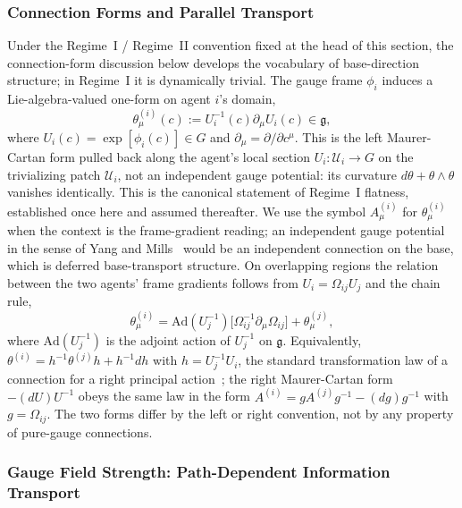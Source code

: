 \documentclass[11pt]{article}
\begin{document}
\subsubsection{Connection Forms and Parallel Transport}
\label{sec:connection_forms}

Under the Regime~I / Regime~II convention fixed at the head of this section, the connection-form discussion below develops the vocabulary of base-direction structure; in Regime~I it is dynamically trivial. The gauge frame $\phi_i$ induces a Lie-algebra-valued one-form on agent $i$'s domain,
\begin{equation}
\theta^{(i)}_\mu(c) := U_i^{-1}(c) \partial_\mu U_i(c) \in \mathfrak{g},
\label{eq:connection_form}
\end{equation}
where $U_i(c) = \exp[\phi_i(c)] \in G$ and $\partial_\mu = \partial/\partial c^\mu$. This is the left Maurer-Cartan form pulled back along the agent's local section $U_i: \mathcal{U}_i \to G$ on the trivializing patch $\mathcal{U}_i$, not an independent gauge potential: its curvature $d\theta + \theta \wedge \theta$ vanishes identically. This is the canonical statement of Regime~I flatness, established once here and assumed thereafter. We use the symbol $A^{(i)}_\mu$ for $\theta^{(i)}_\mu$ when the context is the frame-gradient reading; an independent gauge potential in the sense of Yang and Mills~\cite{Yang1954, Utiyama1956} would be an independent connection on the base, which is deferred base-transport structure. On overlapping regions the relation between the two agents' frame gradients follows from $U_i = \Omega_{ij} U_j$ and the chain rule,
\begin{equation}
\theta^{(i)}_\mu = \mathrm{Ad}(U_j^{-1})\big[\Omega_{ij}^{-1} \partial_\mu \Omega_{ij}\big] + \theta^{(j)}_\mu,
\label{eq:theta_overlap_relation}
\end{equation}
where $\mathrm{Ad}(U_j^{-1})$ is the adjoint action of $U_j^{-1}$ on $\mathfrak{g}$. Equivalently, $\theta^{(i)} = h^{-1}\theta^{(j)}h + h^{-1}dh$ with $h = U_j^{-1}U_i$, the standard transformation law of a connection for a right principal action~\cite{Nakahara2003, WuYang1975}; the right Maurer-Cartan form $-(dU)U^{-1}$ obeys the same law in the form $A^{(i)} = gA^{(j)}g^{-1} - (dg)g^{-1}$ with $g = \Omega_{ij}$. The two forms differ by the left or right convention, not by any property of pure-gauge connections.

\subsubsection{Gauge Field Strength: Path-Dependent Information Transport}
\label{sec:field_strength}
\end{document}
